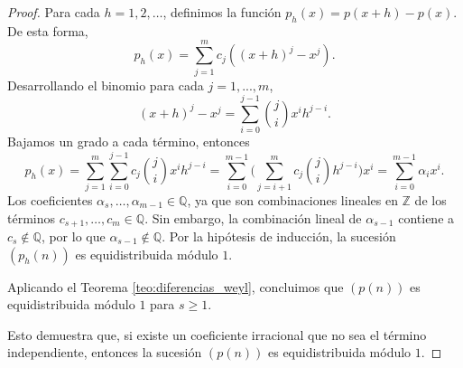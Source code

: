 \begin{proof}
    Para cada $h=1,2,\dots$, definimos la función $p_h(x) = p(x+h) - p(x)$. De esta forma, 
    \[
        p_h(x) = \sum_{j=1}^m c_j ((x+h)^j - x^j).
    \]
    Desarrollando el binomio para cada $j=1,...,m$,
    \[
        (x+h)^j - x^j = \sum_{i=0}^{j-1} \binom{j}{i} x^{i} h^{j-i}.
    \]
    Bajamos un grado a cada término, entonces
    \[
        p_h(x) = 
        \sum_{j=1}^m \sum_{i=0}^{j-1} c_j \binom{j}{i} x^{i} h^{j-i} =
        \sum_{i=0}^{m-1} \Big(\sum_{j=i+1}^m c_j \binom{j}{i} h^{j-i}\Big) x^{i}=
        \sum_{i=0}^{m-1} \alpha_i x^i.
    \]
    Los coeficientes $\alpha_{s}, \dots, \alpha_{m-1} \in \mathbb{Q}$, ya que son 
    combinaciones lineales en $\mathbb{Z}$ de los términos $c_{s+1}, \dots, 
    c_{m}\in\mathbb{Q}$. 
    Sin embargo, la combinación lineal de $\alpha_{s-1}$ contiene a $c_s\notin \mathbb{Q}$, 
    por lo que $\alpha_{s-1} \notin \mathbb{Q}$. 
    Por la hipótesis de inducción, la sucesión $(p_h(n))$ es equidistribuida módulo $1$.
    
    Aplicando el Teorema \ref{teo:diferencias_weyl}, concluimos que $(p(n))$ es 
    equidistribuida módulo $1$ para $s\geq1$. 
    
    Esto demuestra que, si existe un coeficiente irracional 
    que no sea el término independiente, entonces la sucesión $(p(n))$ es equidistribuida módulo $1$.
\end{proof}